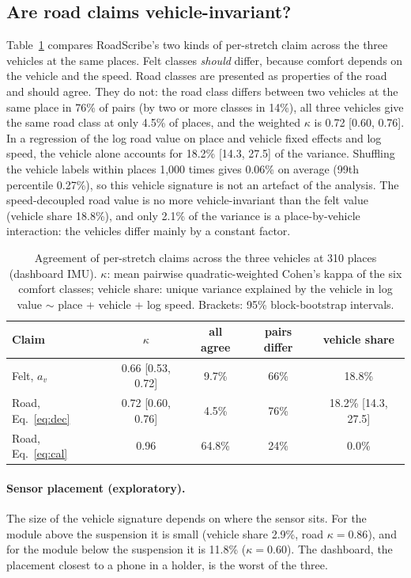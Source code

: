 \subsection{Are road claims vehicle-invariant?}
\label{sec:invariance}
Table~\ref{tab:invariance} compares RoadScribe's two kinds of per-stretch claim across the three vehicles at the same places.
Felt classes \emph{should} differ, because comfort depends on the vehicle and the speed.
Road classes are presented as properties of the road and should agree.
They do not: the road class differs between two vehicles at the same place in 76\% of pairs (by two or more classes in 14\%), all three vehicles give the same road class at only 4.5\% of places, and the weighted $\kappa$ is 0.72 [0.60, 0.76].
In a regression of the log road value on place and vehicle fixed effects and log speed, the vehicle alone accounts for 18.2\% [14.3, 27.5] of the variance.
Shuffling the vehicle labels within places 1{,}000 times gives 0.06\% on average (99th percentile 0.27\%), so this vehicle signature is not an artefact of the analysis.
The speed-decoupled road value is no more vehicle-invariant than the felt value (vehicle share 18.8\%), and only 2.1\% of the variance is a place-by-vehicle interaction: the vehicles differ mainly by a constant factor.

\begin{table}[t]
\caption{Agreement of per-stretch claims across the three vehicles at 310 places (dashboard IMU). $\kappa$: mean pairwise quadratic-weighted Cohen's kappa of the six comfort classes; vehicle share: unique variance explained by the vehicle in log value $\sim$ place + vehicle + log speed. Brackets: 95\% block-bootstrap intervals.}
\label{tab:invariance}
\centering
\small
\setlength{\tabcolsep}{3.5pt}
\begin{tabular}{@{}lcccc@{}}
\toprule
Claim & $\kappa$ & all agree & pairs differ & vehicle share \\
\midrule
Felt, $a_v$ & 0.66 [0.53, 0.72] & 9.7\% & 66\% & 18.8\% \\
Road, Eq.~\eqref{eq:dec} & 0.72 [0.60, 0.76] & 4.5\% & 76\% & 18.2\% [14.3, 27.5] \\
Road, Eq.~\eqref{eq:cal} & 0.96 & 64.8\% & 24\% & 0.0\% \\
\bottomrule
\end{tabular}
\end{table}

\paragraph{Sensor placement (exploratory).}
The size of the vehicle signature depends on where the sensor sits.
For the module above the suspension it is small (vehicle share 2.9\%, road $\kappa=0.86$), and for the module below the suspension it is 11.8\% ($\kappa=0.60$).
The dashboard, the placement closest to a phone in a holder, is the worst of the three.

